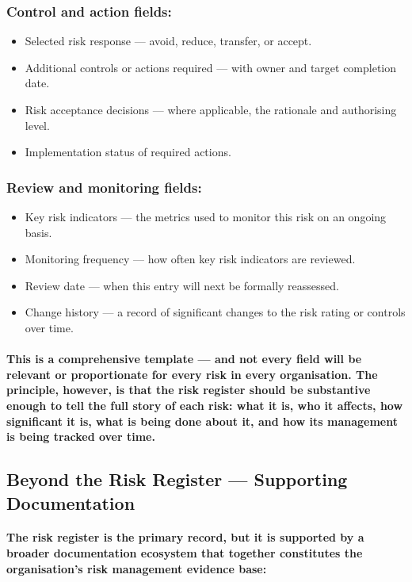 \subsubsection{Control and action fields:}
\begin{itemize}
    \item{Selected risk response — avoid, reduce, transfer, or accept.}
    \item{Additional controls or actions required — with owner and target completion date.}
    \item{Risk acceptance decisions — where applicable, the rationale and authorising level.}
    \item{Implementation status of required actions.}
\end{itemize}
\subsubsection{Review and monitoring fields:}
\begin{itemize}
    \item{Key risk indicators — the metrics used to monitor this risk on an ongoing basis.}
    \item{Monitoring frequency — how often key risk indicators are reviewed.}
    \item{Review date — when this entry will next be formally reassessed.}
    \item{Change history — a record of significant changes to the risk rating or controls over time.}
\end{itemize}

\paragraph{This is a comprehensive template — and not every field will be relevant or proportionate for every risk in every organisation. The principle, however, is that the risk register should be substantive enough to tell the full story of each risk: what it is, who it affects, how significant it is, what is being done about it, and how its management is being tracked over time.}

\subsection{Beyond the Risk Register — Supporting Documentation}
\paragraph{The risk register is the primary record, but it is supported by a broader documentation ecosystem that together constitutes the organisation's risk management evidence base:}
